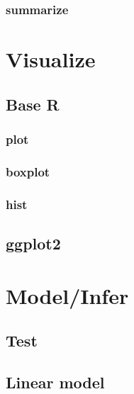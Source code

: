\documentclass[
  12pt,
]{book}
\begin{document}
\hypertarget{summarize}{%
\section{summarize}\label{summarize}}

\hypertarget{part-visualize}{%
\part{Visualize}\label{part-visualize}}

\hypertarget{base-r}{%
\chapter{Base R}\label{base-r}}

\hypertarget{plot}{%
\section{plot}\label{plot}}

\hypertarget{boxplot}{%
\section{boxplot}\label{boxplot}}

\hypertarget{hist}{%
\section{hist}\label{hist}}

\hypertarget{ggplot2}{%
\chapter{ggplot2}\label{ggplot2}}

\hypertarget{part-modelinfer}{%
\part{Model/Infer}\label{part-modelinfer}}

\hypertarget{test}{%
\chapter{Test}\label{test}}

\hypertarget{linear-model}{%
\chapter{Linear model}\label{linear-model}}
\end{document}
